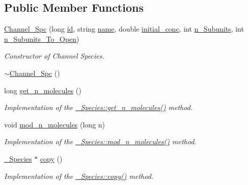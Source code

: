 \subsection*{Public Member Functions}
\begin{DoxyCompactItemize}
\item 
\hyperlink{classnw_1_1_channel___spc_a050d0e4c96bc1ad37b259185e678b0b9}{Channel\+\_\+\+Spc} (long \hyperlink{classnw_1_1___species_ac42dfe1c656c17178a9649093519ebb7}{id}, string \hyperlink{classnw_1_1___species_a7b8ede09e28941beb48cf27f1247e2f9}{name}, double \hyperlink{classnw_1_1___species_ac66cdd3bdd5be88791e00d063b4e92a2}{initial\+\_\+conc}, int \hyperlink{classnw_1_1_channel___spc_a2b63ef7e5147046919cf96060b57e078}{n\+\_\+\+Subunits}, int \hyperlink{classnw_1_1_channel___spc_a52e6e8aae67ebfb6cec1b79e7f125542}{n\+\_\+\+Subunits\+\_\+\+To\+\_\+\+Open})
\begin{DoxyCompactList}\small\item\em Constructor of Channel Species. \end{DoxyCompactList}\item 
\hyperlink{classnw_1_1_channel___spc_a6bcdcda43c49d5223ccf9398c63f5170}{$\sim$\+Channel\+\_\+\+Spc} ()
\item 
long \hyperlink{classnw_1_1_channel___spc_a20a1e6dd089794ad0e1035635a1e3fe0}{get\+\_\+n\+\_\+molecules} ()
\begin{DoxyCompactList}\small\item\em Implementation of the \hyperlink{classnw_1_1___species_a6e3e68477663ff511d75fb24cf01cb9f}{\+\_\+\+Species\+::get\+\_\+n\+\_\+molecules()} method. \end{DoxyCompactList}\item 
void \hyperlink{classnw_1_1_channel___spc_a03347a88efec50ad3acd0ff4025ed23d}{mod\+\_\+n\+\_\+molecules} (long n)
\begin{DoxyCompactList}\small\item\em Implementation of the \hyperlink{classnw_1_1___species_ac7955c9fe040d8cae8f3cae4684ed96b}{\+\_\+\+Species\+::mod\+\_\+n\+\_\+molecules()} method. \end{DoxyCompactList}\item 
\hyperlink{classnw_1_1___species}{\+\_\+\+Species} $\ast$ \hyperlink{classnw_1_1_channel___spc_ab35f288a4021c302b4e2dc09e54578b1}{copy} ()
\begin{DoxyCompactList}\small\item\em Implementation of the \hyperlink{classnw_1_1___species_aea43d96b0b1c9e88953f40fbe58e7f29}{\+\_\+\+Species\+::copy()} method. \end{DoxyCompactList}\item 

\end{DoxyCompactItemize}
